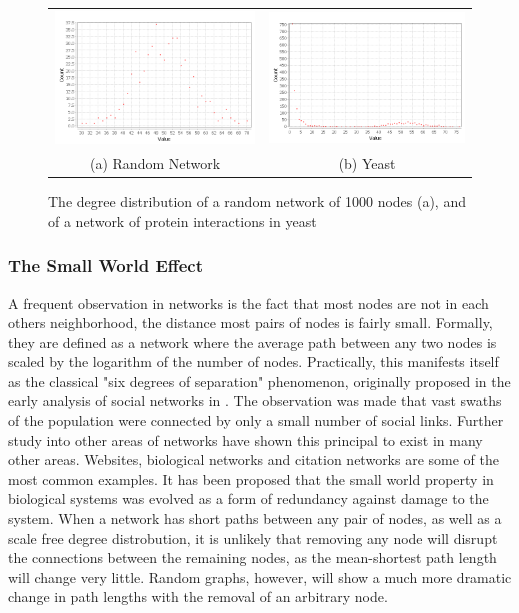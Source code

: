 \begin{figure}
	\begin{tabular}{cc}
		\includegraphics[width=65mm]{images/random-degree-distribution.png} &   \includegraphics[width=65mm]{images/yeast-degree-distribution.png} \\
		(a) Random Network & (b) Yeast \\[6pt]
	\end{tabular}
	\caption{The degree distribution of a random network of 1000 nodes (a), and of a network of protein interactions in yeast\do}
	\label{power}
\end{figure}

\subsubsection{The Small World Effect}

A frequent observation in networks is the fact that most nodes are not in each others neighborhood, the distance most pairs of nodes is fairly small. Formally, they are defined as a network where the average path between any two nodes is scaled by the logarithm of the number of nodes. Practically, this manifests itself as the classical "six degrees of separation" phenomenon, originally proposed in the early analysis of social networks in \cite{gurevitch1961social}. The observation was made that vast swaths of the population were connected by only a small number of social links. Further study into other areas of networks have shown this principal to exist in many other areas. Websites, biological networks and citation networks are some of the most common examples. It has been proposed that the small world property in biological systems was evolved as a form of redundancy against damage to the system\cite{albert2000error}. When a network has short paths between any pair of nodes, as well as a scale free degree distrobution, it is unlikely that removing any node will disrupt the connections between the remaining nodes, as the mean-shortest path length will change very little. Random graphs, however, will show a much more dramatic change in path lengths with the removal of an arbitrary node.


